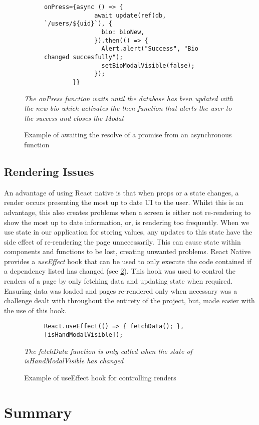 \begin{figure}[!htbp]
    \centering
    \begin{subfigure}[b]{0.8\textwidth}
        \begin{lstlisting}[language=jsJsx]
        onPress={async () => {
              await update(ref(db, `/users/${uid}`), {
                bio: bioNew,
              }).then(() => {
                Alert.alert("Success", "Bio changed succesfully");
                setBioModalVisible(false);
              });
        }}
        \end{lstlisting}
    \end{subfigure}
\caption{Example of awaiting the resolve of a promise from an asynchronous function}
\small\textit{The onPress function waits until the database has been updated with the new bio which activates the then function that alerts the user to the success and closes the Modal}
\label{fig:asyncAwait}
\end{figure}
\FloatBarrier

\subsection*{Rendering Issues}
An advantage of using React native is that when props or a state changes, a render occurs presenting the most up to date UI to the user. Whilst this is an advantage, this also creates problems when a screen is either not re-rendering to show the most up to date information, or, is rendering too frequently. When we use state in our application for storing values, any updates to this state have the side effect of re-rendering the page unnecessarily. This can cause state within components and functions to be lost, creating unwanted problems. React Native provides a \textit{useEffect} hook that can be used to only execute the code contained if a dependency listed has changed (see \ref{fig:useEffect}). This hook was used to control the renders of a page by only fetching data and updating state when required. Ensuring data was loaded and pages re-rendered only when necessary was a challenge dealt with throughout the entirety of the project, but, made easier with the use of this hook.
\begin{figure}[!htbp]
    \centering
    \begin{subfigure}[b]{0.8\textwidth}
        \begin{lstlisting}[language=jsJsx]
        React.useEffect(() => { fetchData(); }, [isHandModalVisible]);
        \end{lstlisting}
    \end{subfigure}
\caption{Example of useEffect hook for controlling renders}
\small\textit{The fetchData function is only called when the state of isHandModalVisible has changed}
\label{fig:useEffect}
\end{figure}
\FloatBarrier
\section{Summary}